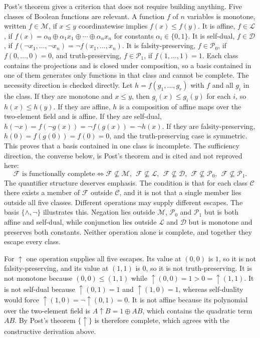 \documentclass[11pt]{article}
\theoremstyle{definition}
\theoremstyle{remark}
\newcommand{\nand}{\uparrow}
\begin{document}
Post's theorem \cite{post1941} gives a criterion that does not require building anything. Five classes of Boolean functions are relevant. A function $f$ of $n$ variables is monotone, written $f \in \mathcal{M}$, if $x \le y$ coordinatewise implies $f(x) \le f(y)$. It is affine, $f \in \mathcal{L}$, if $f(x) = \alpha_0 \oplus \alpha_1 x_1 \oplus \cdots \oplus \alpha_n x_n$ for constants $\alpha_i \in \{0,1\}$. It is self-dual, $f \in \mathcal{D}$, if $f(\neg x_1, \dots, \neg x_n) = \neg f(x_1, \dots, x_n)$. It is falsity-preserving, $f \in \mathcal{P}_0$, if $f(0,\dots,0) = 0$, and truth-preserving, $f \in \mathcal{P}_1$, if $f(1,\dots,1) = 1$. Each class contains the projections and is closed under composition, so a basis contained in one of them generates only functions in that class and cannot be complete. The necessity direction is checked directly. Let $h = f(g_1, \dots, g_r)$ with $f$ and all $g_i$ in the class. If they are monotone and $x \le y$, then $g_i(x) \le g_i(y)$ for each $i$, so $h(x) \le h(y)$. If they are affine, $h$ is a composition of affine maps over the two-element field and is affine. If they are self-dual, $h(\neg x) = f(\neg g(x)) = \neg f(g(x)) = \neg h(x)$. If they are falsity-preserving, $h(0) = f(g(0)) = f(0) = 0$, and the truth-preserving case is symmetric. This proves that a basis contained in one class is incomplete. The sufficiency direction, the converse below, is Post's theorem and is cited and not reproved here:
\[
\mathcal{F} \text{ is functionally complete} \iff \mathcal{F} \not\subseteq \mathcal{M},\ \ \mathcal{F} \not\subseteq \mathcal{L},\ \ \mathcal{F} \not\subseteq \mathcal{D},\ \ \mathcal{F} \not\subseteq \mathcal{P}_0,\ \ \mathcal{F} \not\subseteq \mathcal{P}_1 .
\]
The quantifier structure deserves emphasis. The condition is that for each class $\mathcal{C}$ there exists a member of $\mathcal{F}$ outside $\mathcal{C}$, and it is not that a single member lies outside all five classes. Different operations may supply different escapes. The basis $\{\land, \neg\}$ illustrates this. Negation lies outside $\mathcal{M}$, $\mathcal{P}_0$ and $\mathcal{P}_1$ but is both affine and self-dual, while conjunction lies outside $\mathcal{L}$ and $\mathcal{D}$ but is monotone and preserves both constants. Neither operation alone is complete, and together they escape every class.

For $\nand$ one operation supplies all five escapes. Its value at $(0,0)$ is $1$, so it is not falsity-preserving, and its value at $(1,1)$ is $0$, so it is not truth-preserving. It is not monotone because $(0,0) \le (1,1)$ while $\nand(0,0) = 1 > 0 = \nand(1,1)$. It is not self-dual because $\nand(0,1) = 1$ and $\nand(1,0) = 1$, whereas self-duality would force $\nand(1,0) = \neg\nand(0,1) = 0$. It is not affine because its polynomial over the two-element field is $A \nand B = 1 \oplus AB$, which contains the quadratic term $AB$. By Post's theorem $\{\nand\}$ is therefore complete, which agrees with the constructive derivation above.
\end{document}
